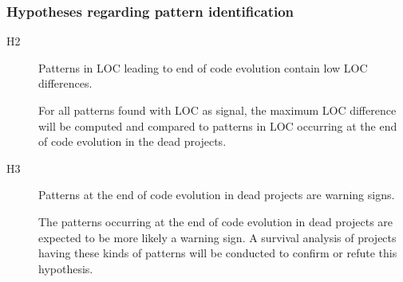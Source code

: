 \subsubsection{Hypotheses regarding pattern identification}
\begin{description}
	\item[H2\label{hyp:pattern_low_diff}] \hspace{0em}
	Patterns in LOC leading to end of code evolution contain low LOC differences.

	For all patterns found with LOC as signal, the maximum LOC difference will be
	computed and compared to patterns in LOC occurring at the end of code
	evolution in the dead projects.
	
	\item[H3\label{hyp:pattern_types}] \hspace{0em}
	Patterns at the end of code evolution in dead projects are warning signs.

	The patterns occurring at the end of code evolution in dead projects are
	expected to be more likely a warning sign. A survival analysis of projects
	having these kinds of patterns will be conducted to confirm or refute this
	hypothesis.
\end{description}

\begin{comment}
- The plan
- Methodology / method per question
- Hypotheses
- Validation

This section describes the methods used to answer the research questions. A
good structure of this section often follows the sub questions by providing a
method for each.

The research method can be based on the “Scientific method”, but more creative
solutions could be defined as well. In any case, the method needs a thorough
motivation grounded in theory in order to be acceptable.

As part of the method a number of hypotheses are described. These hypotheses
will be tested by the research, using the methods described here.

An important part of this section is validation. How will you evaluate and
validate the outcomes of the research? You can look at Paul Klint’s homepage
for examples of this section as
well\footnote{http://homepages.cwi.nl/~paulk/thesesMasterSoftwareEngineering/2006/RichardKettelerij.pdf}.
\end{comment}